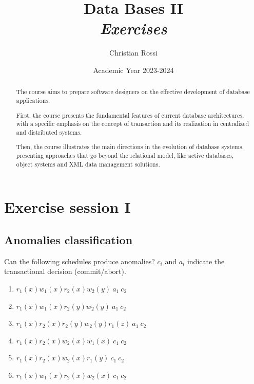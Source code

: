 \documentclass[12pt, a4paper]{report}
\title{Data Bases II \\ \textit{Exercises}}
\author{Christian Rossi}
\date{Academic Year 2023-2024}
\newtheorem[style=M,bodystyle=\normalfont]{theorem}{Theorem}
\newtheorem[style=M,bodystyle=\normalfont]{corollary}{Corollary}
\newtheorem[style=M,bodystyle=\normalfont]{lemma}{Lemma}
\newtheorem[style=M,bodystyle=\normalfont]{definition}{Definition}
\begin{document}
\maketitle

\newpage

\begin{abstract}
    The course aims to prepare software designers on the effective development of database applications. 
    
    First, the course presents the fundamental features of current database architectures, with a specific emphasis on the concept of transaction and its realization in centralized 
    and distributed systems. 
    
    Then, the course illustrates the main directions in the evolution of database systems, presenting approaches that go beyond the relational model, like active databases, object 
    systems and XML data management solutions.
\end{abstract}

\newpage

\tableofcontents

\newpage

\chapter{Exercise session I}
    \section{Anomalies classification}
        Can the following schedules produce anomalies? $c_i$ and $a_i$ indicate the transactional decision (commit/abort). 
        \begin{enumerate}
            \item $r_1(x) w_1(x) r_2(x) w_2(y)\:a_1\:c_2$
            \item $r_1(x) w_1(x) r_2(y) w_2(y)\:a_1\:c_2$
            \item $r_1(x) r_2(x) r_2(y) w_2(y) r_1(z)\:a_1\:c_2$
            \item $r_1(x) r_2(x) w_2(x) w_1(x)\:c_1\:c_2$
            \item $r_1(x) r_2(x) w_2(x) r_1(y)\:c_1\:c_2$
            \item $r_1(x) w_1(x) r_2(x) w_2(x)\:c_1\:c_2$
        \end{enumerate}
\end{document}
